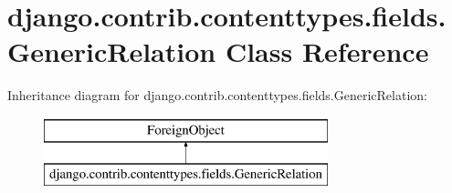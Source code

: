 \hypertarget{classdjango_1_1contrib_1_1contenttypes_1_1fields_1_1_generic_relation}{}\section{django.\+contrib.\+contenttypes.\+fields.\+Generic\+Relation Class Reference}
\label{classdjango_1_1contrib_1_1contenttypes_1_1fields_1_1_generic_relation}
Inheritance diagram for django.\+contrib.\+contenttypes.\+fields.\+Generic\+Relation\+:\begin{figure}[H]
\begin{center}
\leavevmode
\includegraphics[height=2.000000cm]{classdjango_1_1contrib_1_1contenttypes_1_1fields_1_1_generic_relation}
\end{center}
\end{figure}
